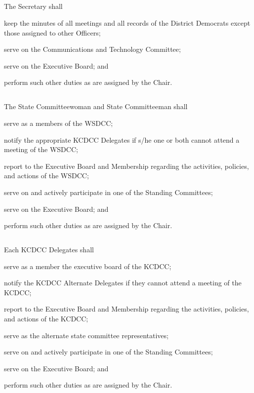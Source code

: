 \subsection{}
The Secretary shall
\begin{inlinealphalist}
    \item keep the minutes of all meetings and all records of the \fortythird{} District Democrats except those assigned to other Officers;
    \item serve on the Communications and Technology Committee;
    \item serve on the Executive Board; and
    \item perform such other duties as are assigned by the Chair.
\end{inlinealphalist}

\subsection{}
The State Committeewoman and State Committeeman shall
\begin{inlinealphalist}
    \item serve as a members of the WSDCC;
    \item notify the appropriate KCDCC Delegates if s/he one or both cannot attend a meeting of the WSDCC;
    \item report to the Executive Board and Membership regarding the activities, policies, and actions of the WSDCC;
    \item serve on and actively participate in one of the Standing Committees;
    \item serve on the Executive Board; and
    \item perform such other duties as are assigned by the Chair.
\end{inlinealphalist}

\subsection{}
Each KCDCC Delegates shall
\begin{inlinealphalist}
    \item serve as a member the executive board of the KCDCC;
    \item notify the KCDCC Alternate Delegates if they cannot attend a meeting of the KCDCC;
    \item report to the Executive Board and Membership regarding the activities, policies, and actions of the KCDCC;
    \item serve as the alternate state committee representatives;
    \item serve on and actively participate in one of the Standing Committees;
    \item serve on the Executive Board; and
    \item perform such other duties as are assigned by the Chair.
\end{inlinealphalist}

